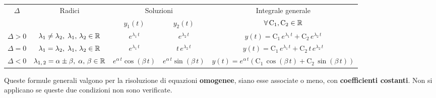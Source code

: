 \documentclass[../../analisi2]{subfiles}
\begin{document}
            \begin{table}[h!]

                \centering

                \begin{tabular}{||c|c|c|c|c||}
                    \hline
                    \multirow{2}{*}{\(\Delta\)} & \multirow{2}{*}{Radici} & \multicolumn{2}{c|}{Soluzioni} & Integrale generale\\ \cline{3-5}
                    & & \(y_1(t)\) & \(y_2(t)\) & \(\forall \, \mathrm{C_1}, \mathrm{C_2} \in \mathbb{R}\)\\
                    \hline\hline
                    \(\Delta > 0\) & \(\lambda_1 \neq \lambda_2, \; \lambda_1, \, \lambda_2 \in \mathbb{R}\) & \(e^{\lambda_1 \, t}\) & \(e^{\lambda_2 \, t}\) & \(y(t) = \mathrm{C_1} \, e^{\lambda_1 \, t} + \mathrm{C_2} \, e^{\lambda_2 \, t}\)\\
                    \hline
                    \(\Delta = 0\) & \(\lambda_1 = \lambda_2, \; \lambda_1, \, \lambda_2 \in \mathbb{R}\) & \(e^{\lambda_1 \, t}\) & \(t \, e^{\lambda_2 \, t}\) & \(y(t) = \mathrm{C_1} \, e^{\lambda_1 \, t} + \mathrm{C_2} \, t \, e^{\lambda_2 \, t}\)\\
                    \hline
                    \(\Delta < 0\) & \(\lambda_{1, \, 2} = \alpha \pm \beta, \; \alpha, \, \beta \in \mathbb{R}\) & \(e^{\alpha \, t} \cos(\beta \, t)\) & \(e^{\alpha \, t} \sin(\beta \, t)\) & \(y(t) = e^{\alpha \, t} \left(\mathrm{C_1} \, \cos(\beta \, t) + \mathrm{C_2} \, \sin(\beta \, t)\right)\)\\
                    \hline
                \end{tabular}
                
            \end{table}

            Queste formule generali valgono per la risoluzione di equazioni \textbf{omogenee}, siano esse associate o meno, con
            \textbf{coefficienti costanti}. Non si applicano se queste due condizioni non sono verificate.
            
\end{document}
